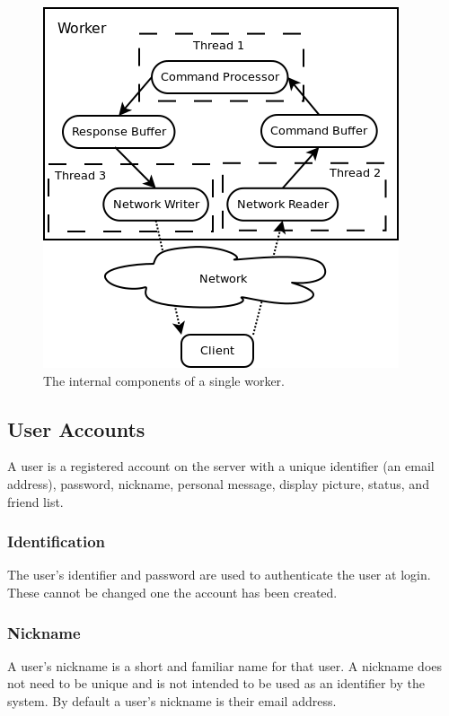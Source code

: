 \begin{figure}[!h]
    \begin{center}
        \includegraphics[scale=0.6]{Design/diagrams/worker_detail.png}
        \caption{The internal components of a single worker.}
        \label{WorkerDatailedDia}
    \end{center}
\end{figure}

\subsection{User Accounts}
A user is a registered account on the server with a unique identifier (an email address), password, nickname, personal message, display picture, status, and friend list. 

\subsubsection{Identification}
The user's identifier and password are used to authenticate the user at login. These cannot be changed one the account has been created. 


\subsubsection{Nickname}
A user's nickname is a short and familiar name for that user. A nickname does not need to be unique and is not intended to be used as an identifier by the system. By default a user's nickname is their email address.


